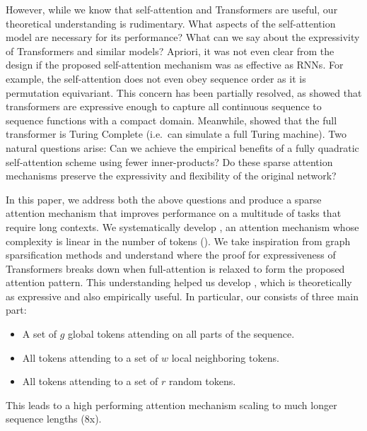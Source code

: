 However, while we know that self-attention and Transformers are useful, our theoretical
understanding is rudimentary. What aspects of the self-attention model are necessary for its performance?
What can we say about the expressivity of Transformers and similar models? Apriori, it was not 
even clear from the  design if the proposed self-attention mechanism was as effective as RNNs. 
For example, the self-attention does not even obey sequence order as it is permutation equivariant. 
This concern has been partially resolved, as \citet{Yun19} showed that transformers are expressive 
enough to capture all continuous sequence to sequence functions with a compact domain. 
Meanwhile, \citet{Perez19} showed that the full  transformer is Turing Complete 
(i.e.~can simulate a full Turing machine). Two natural questions arise: Can we achieve the empirical 
benefits of a fully quadratic self-attention scheme using fewer inner-products? Do these 
sparse attention mechanisms preserve the expressivity and flexibility of the original network?

In this paper, we address both the above questions and produce a sparse attention mechanism  that
improves performance on a multitude of tasks that require long contexts.
We systematically develop \bigb, an attention mechanism whose complexity 
is linear in the number of tokens (). We take inspiration from graph 
sparsification methods and understand  where the proof for expressiveness of Transformers 
breaks down when full-attention is relaxed to form the proposed attention pattern. This understanding
helped us develop \bigb, which is theoretically as expressive and also empirically useful. 
In particular, our \bigb consists of three main part:

\begin{itemize}[leftmargin=6mm, itemsep=0mm, partopsep=0pt,parsep=0pt]
    \item A set of $g$ global tokens attending on all parts of the sequence.
    \item All tokens attending to a set of $w$ local neighboring tokens.
    \item All tokens attending to a set of $r$ random tokens.
\end{itemize}
This leads to a high performing attention mechanism scaling to much longer sequence lengths (8x).

